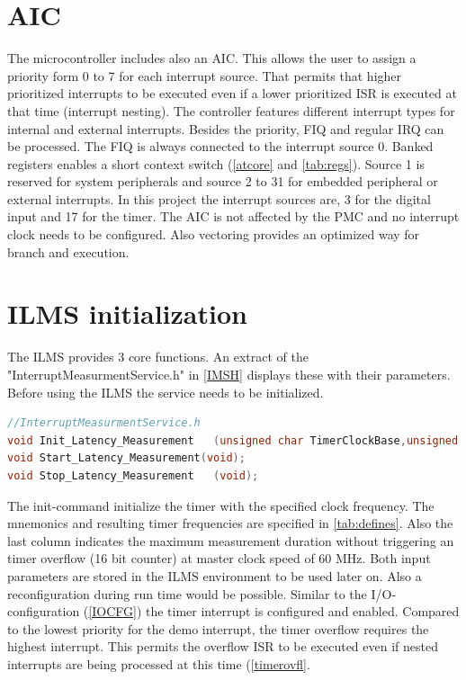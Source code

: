 \section{\ac{AIC}}
\label{sec:AIC}
The microcontroller includes also an \acf{AIC}. This allows the user to assign a priority form 0 to 7 for each interrupt source. That permits that higher prioritized interrupts to be executed even if a lower prioritized \ac{ISR} is executed at that time (interrupt nesting). The controller features different interrupt types for internal and external interrupts. Besides the priority, \acf{FIQ} and regular \acf{IRQ} can be processed. The \ac{FIQ} is always connected to the interrupt source 0. Banked registers enables a short context switch (\autoref{atcore} and \autoref{tab:regs}). Source 1 is reserved for system peripherals and source 2 to 31 for embedded peripheral or external interrupts. In this project the interrupt sources are, 3 for the digital input and 17 for the timer. The \ac{AIC} is not affected by the \ac{PMC} and no interrupt clock needs to be configured. Also vectoring provides an optimized way for branch and execution.\cite{AT91AIC}\\ %

\section{\acs{ILMS} initialization}
The \ac{ILMS} provides 3 core functions. An extract of the "InterruptMeasurmentService.h" in \autoref{IMSH} displays these with their parameters. Before using the \ac{ILMS} the service needs to be initialized.\\
\begin{lstlisting}[language=C, caption={InterruptMeasurmentService.h functions}, label={IMSH}]
//InterruptMeasurmentService.h
void Init_Latency_Measurement	(unsigned char TimerClockBase,unsigned char TimerInterruptCompensation);
void Start_Latency_Measurement(void);
void Stop_Latency_Measurement	(void);
\end{lstlisting}
The init-command initialize the timer with the specified clock frequency. The mnemonics and resulting timer frequencies are specified in \autoref{tab:defines}. Also the last column indicates the maximum measurement duration without triggering an timer overflow (16 bit counter) at master clock speed of 60 MHz. Both input parameters are stored in the \ac{ILMS} environment to be used later on. Also a reconfiguration during run time would be possible. Similar to the I/O-configuration (\autoref{IOCFG}) the timer interrupt is configured and enabled. Compared to the lowest priority for the demo interrupt, the timer overflow requires the highest interrupt. This permits the overflow \ac{ISR} to be executed even if nested interrupts are being processed at this time (\autoref{timerovfl}.\\

